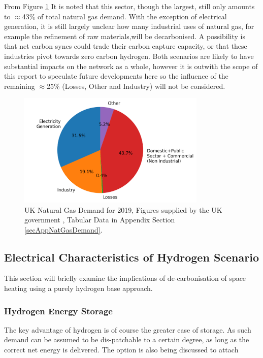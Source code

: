 \documentclass[11pt]{article}
\numberwithin{equation}{section}
\begin{document}
From Figure \ref{figNatualGassDemandBreakdown} It is noted that this sector, though the largest, still only amounts to \(\approx\)43\% of total natural gas demand. With the exception of electrical generation, it is still largely unclear how many industrial uses of natural gas, for example the refinement of raw materials,will be decarbonised. A possibility is that net carbon syncs could trade their carbon capture capacity, or that these industries pivot towards zero carbon hydrogen. Both scenarios are likely to have substantial impacts on the network as a whole, however it is outwith the scope of this report to speculate future developments here so the influence of the remaining \(\approx\)25\% (Losses, Other and Industry) will not be considered.

\begin{figure}[H]
\centering
\includegraphics[width=0.8\textwidth]{./.ob-jupyter/059e5607973df26cf3fa1f5f9cae00619ccdfac7.png}
\caption{\label{figNatualGassDemandBreakdown}UK Natural Gas Demand for 2019, Figures supplied by the UK government \cite{NaturalGas}, Tabular Data in Appendix Section \ref{secAppNatGasDemand}.}
\end{figure}

\subsection{Electrical Characteristics of Hydrogen Scenario}
\label{sec:orgfb48712}
This section will briefly examine the implications of de-carbonisation of space heating using a purely hydrogen base approach.

\subsubsection{Hydrogen Energy Storage}
\label{sec:orga1f84a0}
The key advantage of hydrogen is of course the greater ease of storage\cite{HydrogenEnergyStorag2}. As such demand can be assumed to be dis-patchable to a certain degree, as long as the correct net energy is delivered. The option is also being discussed to attach
\end{document}
